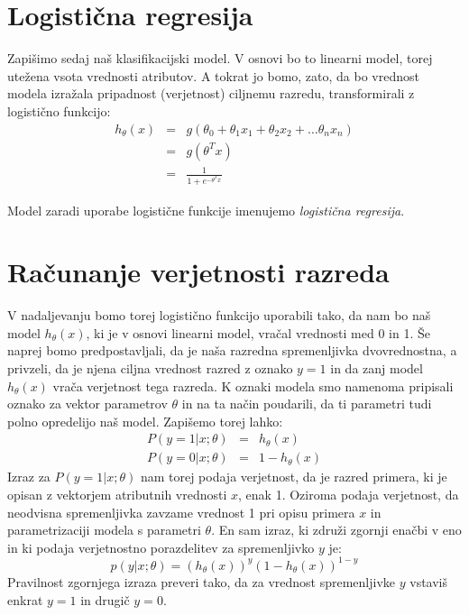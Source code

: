 \section{Logistična regresija}

Zapišimo sedaj naš klasifikacijski model. V osnovi bo to linearni model, torej utežena vsota vrednosti atributov. A tokrat jo bomo, zato, da bo vrednost modela izražala pripadnost (verjetnost) ciljnemu razredu, transformirali z logistično funkcijo:
\begin{eqnarray}
  h_\theta(x) & = & g(\theta_0+\theta_1 x_1+\theta_2 x_2+\ldots\theta_n x_n)
  \nonumber \\
  & = & g(\theta^T x) \nonumber \\
  & = & \frac{1}{1+e^{-\theta^T x}}
  \label{eq:logreg}
\end{eqnarray}

Model zaradi uporabe logistične funkcije imenujemo {\em logistična regresija}.

\section{Računanje verjetnosti razreda}

V nadaljevanju bomo torej logistično funkcijo uporabili tako, da nam bo naš model $h_{\theta}(x)$, ki je v osnovi linearni model, vračal vrednosti med 0 in 1. Še naprej bomo predpostavljali, da je naša razredna spremenljivka dvovrednostna, a privzeli, da je njena ciljna vrednost razred z oznako $y=1$ in da zanj model $h_{\theta}(x)$ vrača verjetnost tega razreda. K oznaki modela smo namenoma pripisali oznako za vektor parametrov $\theta$ in na ta način poudarili, da ti parametri tudi polno opredelijo naš model. Zapišemo torej lahko:
\begin{eqnarray}
  P(y=1|x;\theta) & = & h_\theta(x) \\
  P(y=0|x;\theta) & = & 1-h_\theta(x)
\end{eqnarray}
Izraz za $P(y=1|x;\theta)$ nam torej podaja verjetnost, da je razred primera, ki je opisan z vektorjem atributnih vrednosti $x$, enak 1. Oziroma podaja verjetnost, da neodvisna spremenljivka zavzame vrednost 1 pri opisu primera $x$ in parametrizaciji modela s parametri $\theta$. En sam izraz, ki združi zgornji enačbi v eno in ki podaja verjetnostno porazdelitev za spremenljivko $y$ je:
\begin{equation}
  p(y|x;\theta) = (h_\theta(x))^y(1-h_\theta(x))^{1-y}
\label{eq:log-prob}
\end{equation}
Pravilnost zgornjega izraza preveri tako, da za vrednost spremenljivke $y$ vstaviš enkrat $y=1$ in drugič $y=0$.

